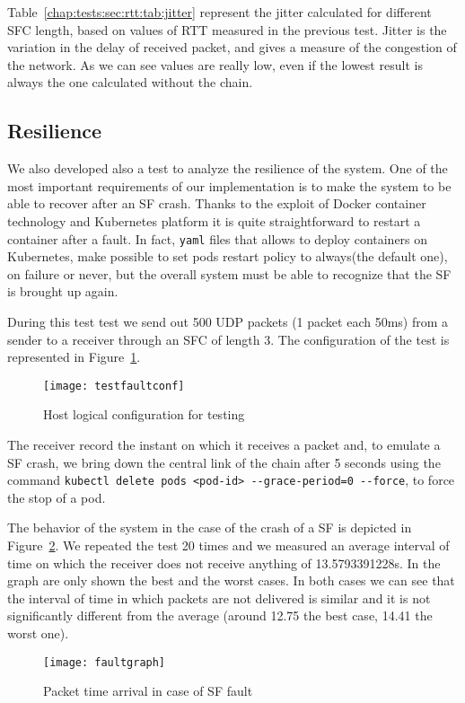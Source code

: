 Table~\ref{chap:tests:sec:rtt:tab:jitter} represent the jitter calculated for
different SFC length, based on values of RTT measured in the previous test.
Jitter is the variation in the delay of received packet, and gives a measure of
the congestion of the network. As we can see values are really low, even if the
lowest result is always the one calculated without the chain.

\subsection{Resilience}
We also developed also a test to analyze the resilience of the system. One of the most important requirements of our implementation is to make the system to be able to recover after an SF crash. Thanks to the exploit of Docker container technology and Kubernetes platform it is quite straightforward to restart a container after a fault. In fact, \texttt{yaml} files that allows to deploy containers on Kubernetes, make possible to set pods restart policy to always(the default one), on failure or never, but the overall system must be able to recognize that the SF is brought up again. 

During this test test we send out 500 UDP packets (1 packet each 50ms) from a sender to a receiver through an SFC of length 3. The configuration of the test is represented in Figure~\ref{chap:tests:sec:fault:img:testfaultconf}.
\begin{figure}[H]
  \centering
  \texttt{[image: testfaultconf]}
  \caption{Host logical configuration for testing}
  \label{chap:tests:sec:fault:img:testfaultconf}
\end{figure}
The receiver record the instant on which it receives a packet and, to emulate a SF crash, we bring down the central link of the chain after 5 seconds using the command \verb!kubectl delete pods <pod-id> --grace-period=0 --force!, to force the stop of a pod.

The behavior of the system in the case of the crash of a SF is depicted in Figure~\ref{chap:tests:sec:fault:img:faultgraph}. We repeated the test 20 times and we measured an average interval of time on which the receiver does not receive anything of 13.5793391228s. In the graph are only shown the best and the worst cases. In both cases we can see that the interval of time in which packets are not delivered is similar and it is not significantly different from the average (around 12.75 the best case, 14.41 the worst one).

\begin{figure}[H]
  \centering
  \texttt{[image: faultgraph]}
  \caption{Packet time arrival in case of SF fault}
  \label{chap:tests:sec:fault:img:faultgraph}
\end{figure}


